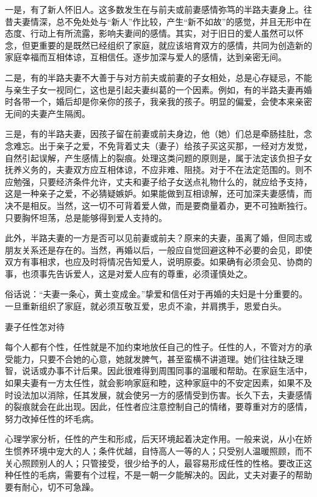 \documentclass[12pt,UTF8]{ctexbook}
\begin{document}
一是，有了新人怀旧人。这多数发生在与前夫或前妻感情弥笃的半路夫妻身上。往昔夫妻情深，总不免处处与“新人”作比较，产生“新不如故”的感觉，并且无形中在态度、行动上有所流露，影响夫妻间的感情。其实，对于旧日的爱人虽然可以怀念，但更重要的是既然已经组织了家庭，就应该培育双方的感情，共同为创造新的家庭幸福而互相体谅，互相信任。逐步加深与爱人的感情，达到亲密无间。

二是，有的半路夫妻不大善于与对方前夫或前妻的子女相处，总是心存疑忌，不能与亲生子女一视同仁，这也是引起夫妻纠葛的一个因素。例如，有的半路夫妻再婚时各带一个，婚后却是你亲你的孩子，我亲我的孩子。明显的偏爱，会使本来亲密无间的夫妻产生隔阂。

三是，有的半路夫妻，因孩子留在前妻或前夫身边，他（她）们总是牵肠挂肚，念念难忘。出于亲子之爱，不免背着丈夫（妻子）给孩子买这买那，一经对方发觉，自然引起误解，产生感情上的裂痕。处理这类问题的原则是，属于法定该负担子女抚养义务的，夫妻双方应互相体谅，不应非难、阻挠。对于不在法定范围的。则不应勉强，只要经济条件允许，丈夫和妻子给子女送点礼物什么的，就应给予支持，这是一种亲子之爱，不必猜疑嫉妒。如果能做到互相谅解，还可加深夫妻感情，而决不是相反。当然，这一切不可背着爱人做，而是要商量着办，更不可独断独行。只要胸怀坦荡，总是能够得到爱人支持的。

此外，半路夫妻的一方是否可以见前妻或前夫？原来的夫妻，虽离了婚，但同志或朋友关系还是存在的。当然，再婚以后，一般应自觉回避这种不必要的会见，即使双方有事相求，也应及时将情况告知爱人，说明原委。如果确有必须会见、协商的事，也须事先告诉爱人，这是对爱人应有的尊重，必须谨慎处之。

俗话说：“夫妻一条心，黄土变成金。”挚爱和信任对于再婚的夫妇是十分重要的。一旦重新组织了家庭，就必须互敬互爱，忠贞不渝，并肩携手，恩爱白头。





妻子任性怎对待


每个人都有个性，任性就是不加约束地放任自己的性子。任性的人，不管对方的承受能力，只要不合她的心意，她就发脾气，甚至蛮横不讲道理。她们往往缺乏理智，说话或办事不计后果。因此很难得到周围同事的温暖和帮助。在家庭生活中，如果夫妻有一方太任性，就会影响家庭和睦，这种家庭中的不安定因素，如果不及时设法加以消除，任其发展，就会使另一方的感情受到伤害。长久下去，夫妻感情的裂痕就会在此出现。因此，任性者应注意控制自己的情绪，要尊重对方的感情，努力改掉任性的坏毛病。

心理学家分析，任性的产生和形成，后天环境起着决定作用。一般来说，从小在娇生惯养环境中宠大的人；条件优越，自恃高人一等的人；只受别人温暖照顾，而不关心照顾别人的人；只管接受，很少给予的人，最容易形成任性的性格。要改正这种任性的毛病，需要有个过程，不是一朝一夕能解决的。因此，丈夫对妻子的帮助要有耐心，切不可急躁。
\end{document}
